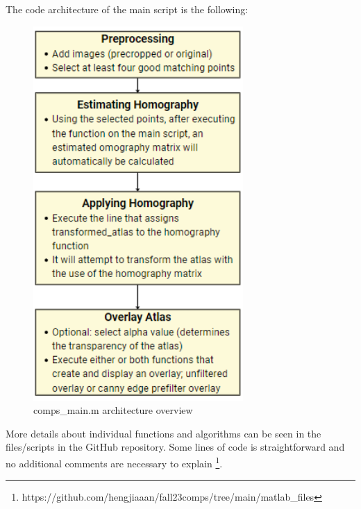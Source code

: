 \documentclass[10pt,twocolumn]{article}
\begin{document}
The code architecture of the main script is the following:
\begin{figure}[htp]
    \centering
    \includegraphics[width=8cm]{overview.png}
    \caption{comps\_main.m architecture overview}
\end{figure}


More details about individual functions and algorithms can be seen in the files/scripts in the GitHub repository. Some lines of code is straightforward and no additional comments are necessary to explain \footnote{https://github.com/hengjiaaan/fall23comps/tree/main/matlab\_files}.

\printbibliography
\end{document}
